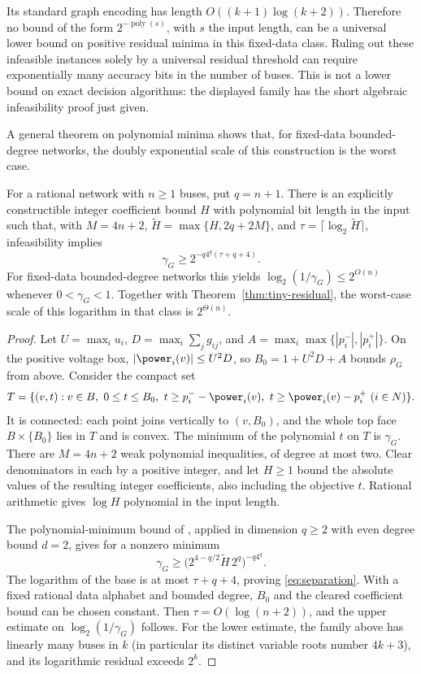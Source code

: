 Its standard graph encoding has length $O((k+1)\log(k+2))$. Therefore no
bound of the form $2^{-\operatorname{poly}(s)}$, with $s$ the input length,
can be a universal lower bound on positive residual minima in this fixed-data
class. Ruling out these infeasible instances solely by a universal residual
threshold can require exponentially many accuracy bits in the number of
buses. This is not a lower bound on exact decision algorithms: the displayed
family has the short algebraic infeasibility proof just given.

A general theorem on polynomial minima shows that, for fixed-data
bounded-degree networks, the doubly exponential scale of this construction
is the worst case.

\begin{proposition}
\label{prop:residual-separation}
For a rational network with $n\ge1$ buses, put $q=n+1$.
There is an explicitly constructible integer coefficient bound $H$ with
polynomial bit length in the input such that, with
$M=4n+2$, $\widetilde H=\max\{H,2q+2M\}$, and
$\tau=\lceil\log_2\widetilde H\rceil$, infeasibility implies
\begin{equation}
 \gamma_G\ge 2^{-q4^q(\tau+q+4)}.
 \label{eq:separation}
\end{equation}
For fixed-data bounded-degree networks this yields
$\log_2(1/\gamma_G)\le2^{O(n)}$ whenever $0<\gamma_G<1$.
Together with Theorem~\ref{thm:tiny-residual}, the worst-case scale of
this logarithm in that class is $2^{\Theta(n)}$.
\end{proposition}
\begin{proof}
Let $U=\max_i u_i$, $D=\max_i\sum_j g_{ij}$, and
$A=\max_i\max\{|p_i^-|,|p_i^+|\}$.
On the positive voltage box, $|\power_i(v)|\le U^2D$, so
$B_0=1+U^2D+A$ bounds $\rho_G$ from above. Consider the compact set
\[
 T=\{(v,t):v\in B,\ 0\le t\le B_0,\
             t\ge p_i^- -\power_i(v),\
             t\ge\power_i(v)-p_i^+\ (i\in N)\}.
\]
It is connected: each point joins vertically to $(v,B_0)$, and the whole
top face $B\times\{B_0\}$ lies in $T$ and is convex. The minimum of
the polynomial $t$ on $T$ is $\gamma_G$.
There are $M=4n+2$ weak polynomial inequalities, of degree at most two.
Clear denominators in each by a positive integer, and let $H\ge1$ bound
the absolute values of the resulting integer coefficients, also including
the objective $t$. Rational arithmetic gives $\log H$ polynomial in the
input length.

The polynomial-minimum bound of
\citet[Theorem 1.1]{JeronimoEtAl2013}, applied in dimension $q\ge2$
with even degree bound $d=2$, gives for a nonzero minimum
\[
 \gamma_G\ge
  \bigl(2^{4-q/2}\widetilde H\,2^q\bigr)^{-q4^q}.
\]
The logarithm of the base is at most $\tau+q+4$, proving
\eqref{eq:separation}. With a fixed rational data alphabet and bounded
degree, $B_0$ and the cleared coefficient bound can be chosen constant.
Then $\tau=O(\log(n+2))$, and the upper estimate on
$\log_2(1/\gamma_G)$ follows. For the lower estimate, the family above
has linearly many buses in $k$ (in particular its distinct variable roots
number $4k+3$), and its logarithmic residual exceeds $2^k$.
\end{proof}


